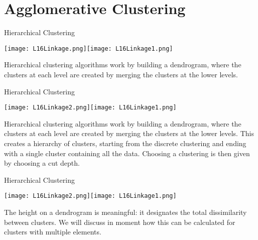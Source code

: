 \documentclass[10pt, table, dvipsnames,xcdraw, handout]{beamer}
\begin{document}
\section{Agglomerative Clustering}


\begin{frame}[fragile]{Hierarchical Clustering}
  \begin{minipage}[t][0.5\textheight][t]{\textwidth}
	\centering \texttt{[image: L16Linkage.png]}\texttt{[image: L16Linkage1.png]}
  \end{minipage}
  \vfill
\begin{minipage}[t][0.5\textheight][t]{\textwidth}
Hierarchical clustering algorithms work by building a dendrogram, where the clusters at each level are created by merging the clusters at the lower levels. 
\end{minipage}
\end{frame}



\begin{frame}[fragile]{Hierarchical Clustering}
  \begin{minipage}[t][0.5\textheight][t]{\textwidth}
	\centering \texttt{[image: L16Linkage2.png]}\texttt{[image: L16Linkage1.png]}
  \end{minipage}
  \vfill
\begin{minipage}[t][0.5\textheight][t]{\textwidth}
Hierarchical clustering algorithms work by building a dendrogram, where the clusters at each level are created by merging the clusters at the lower levels. This creates a hierarchy of clusters, starting from the discrete clustering and ending with a single cluster containing all the data. \pause Choosing a clustering is then given by choosing a cut depth. 
\end{minipage}
\end{frame}




\begin{frame}[fragile]{Hierarchical Clustering}
  \begin{minipage}[t][0.5\textheight][t]{\textwidth}
	\centering \texttt{[image: L16Linkage2.png]}\texttt{[image: L16Linkage1.png]}
  \end{minipage}
  \vfill
\begin{minipage}[t][0.5\textheight][t]{\textwidth}
The height on a dendrogram is meaningful: it designates the total dissimilarity between clusters. We will discuss in moment how this can be calculated for clusters with multiple elements. 
\end{minipage}
\end{frame}
\end{document}
